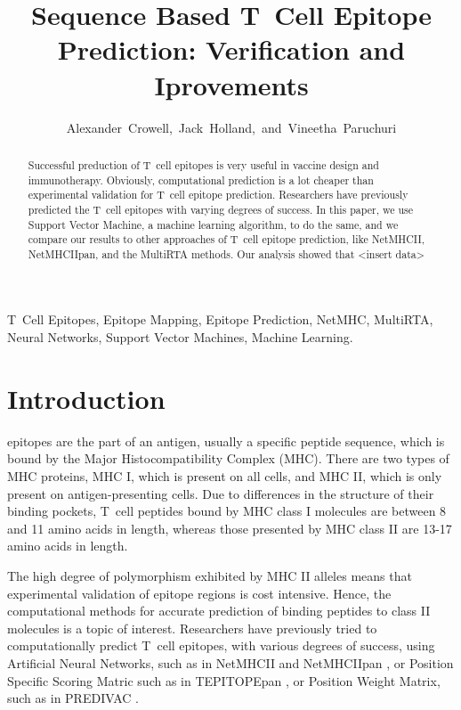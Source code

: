 \documentclass[journal]{IEEEtran}
\begin{document}
\title{Sequence Based T~Cell Epitope Prediction: Verification and Iprovements}

\author{Alexander~Crowell,~Jack~Holland,~and~Vineetha~Paruchuri}


\maketitle


\begin{abstract}
Successful preduction of T~cell epitopes is very useful in vaccine design and immunotherapy. Obviously, computational prediction is a lot cheaper than experimental validation for T~cell epitope prediction. Researchers have previously predicted the T~cell epitopes with varying degrees of success. In this paper, we use Support Vector Machine, a machine learning algorithm, to do the same, and we compare our results to other approaches of T~cell epitope prediction, like NetMHCII, NetMHCIIpan, and the MultiRTA methods. Our analysis showed that <insert data> 
\end{abstract}


\begin{IEEEkeywords}
T~Cell Epitopes, Epitope Mapping, Epitope Prediction, NetMHC, MultiRTA, Neural Networks, Support Vector Machines, Machine Learning.
\end{IEEEkeywords}





\section{Introduction}

 epitopes are the part of an antigen, usually a specific peptide sequence, which is bound by the Major Histocompatibility Complex (MHC). There are two types of MHC proteins, MHC I, which is present on all cells, and MHC II, which is only present on antigen-presenting cells. Due to differences in the structure of their binding pockets, T~cell peptides bound by MHC class I molecules are between 8 and 11 amino acids in length, whereas those presented by MHC class II are 13-17 amino acids in length. 

The high degree of polymorphism exhibited by MHC II alleles means that experimental validation of epitope regions is cost intensive. Hence, the computational methods for accurate prediction of binding peptides to class II molecules is a topic of interest. Researchers have previously tried to computationally predict T~cell epitopes, with various degrees of success, using Artificial Neural Networks, such as in NetMHCII \cite{NetMHCII} and NetMHCIIpan \cite{NetMHCIIpan}, or Position Specific Scoring Matric \cite{PSSM} such as in TEPITOPEpan \cite{TEPITOPEpan}, or Position Weight Matrix, such as in PREDIVAC \cite{PREDIVAC}. 
\end{document}
